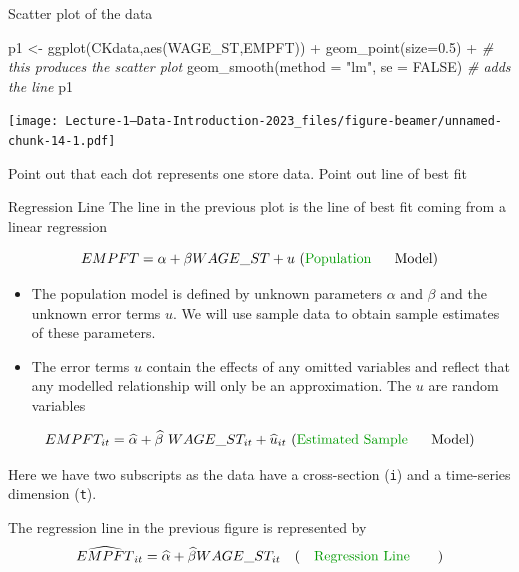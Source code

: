 \documentclass[
  ignorenonframetext,
]{beamer}
\newenvironment{Shaded}{\begin{snugshade}}{\end{snugshade}}
\newcommand{\AttributeTok}[1]{\textcolor[rgb]{0.77,0.63,0.00}{#1}}
\newcommand{\CommentTok}[1]{\textcolor[rgb]{0.56,0.35,0.01}{\textit{#1}}}
\newcommand{\ConstantTok}[1]{\textcolor[rgb]{0.00,0.00,0.00}{#1}}
\newcommand{\FloatTok}[1]{\textcolor[rgb]{0.00,0.00,0.81}{#1}}
\newcommand{\FunctionTok}[1]{\textcolor[rgb]{0.00,0.00,0.00}{#1}}
\newcommand{\NormalTok}[1]{#1}
\newcommand{\OtherTok}[1]{\textcolor[rgb]{0.56,0.35,0.01}{#1}}
\newcommand{\SpecialCharTok}[1]{\textcolor[rgb]{0.00,0.00,0.00}{#1}}
\newcommand{\StringTok}[1]{\textcolor[rgb]{0.31,0.60,0.02}{#1}}
\begin{document}
\begin{frame}[fragile]{Scatter plot of the data}
\protect\hypertarget{scatter-plot-of-the-data}{}
\begin{Shaded}
\begin{Highlighting}[]
\NormalTok{p1 }\OtherTok{\textless{}{-}} \FunctionTok{ggplot}\NormalTok{(CKdata,}\FunctionTok{aes}\NormalTok{(WAGE\_ST,EMPFT)) }\SpecialCharTok{+}
  \FunctionTok{geom\_point}\NormalTok{(}\AttributeTok{size=}\FloatTok{0.5}\NormalTok{) }\SpecialCharTok{+}    \CommentTok{\# this produces the scatter plot}
  \FunctionTok{geom\_smooth}\NormalTok{(}\AttributeTok{method =} \StringTok{"lm"}\NormalTok{, }\AttributeTok{se =} \ConstantTok{FALSE}\NormalTok{)  }\CommentTok{\# adds the line }
\NormalTok{p1}
\end{Highlighting}
\end{Shaded}

\texttt{[image: Lecture-1---Data-Introduction-2023\_files/figure-beamer/unnamed-chunk-14-1.pdf]}

\footnotesize

\textcolor{student}{Point out that each dot represents one store data. Point out line of best fit}
\normalsize
\end{frame}

\begin{frame}{Regression Line}
\protect\hypertarget{regression-line}{}
The line in the previous plot is the line of best fit coming from a
linear regression

\vskip -0.5cm

\[EMPFT = \alpha + \beta WAGE\_ST + u ~\text{(\textcolor{student}{Population}~~~~ Model)}\]
\vskip -0.2cm

\begin{itemize}
  \item The population model is defined by unknown parameters $\alpha$ and $\beta$ and the unknown error terms $u$. We will use sample data to obtain sample estimates of these parameters.
  \item The error terms $u$ contain the effects of any omitted variables and reflect that any modelled relationship will only be an approximation. The $u$ are \textcolor{student}{random variables}
\end{itemize}

\vskip -0.5cm

\[ EMPFT_{it} = \widehat{\alpha} + \widehat{\beta} ~ WAGE\_ST_{it} + \widehat{u}_{it} ~\text{(\textcolor{student}{Estimated Sample} ~~~~Model)}\]
\vskip -0.2cm

Here we have two subscripts as the data have a cross-section
(\texttt{\textcolor{student}{i}}) and a time-series dimension
(\texttt{\textcolor{student}{t}}).

The regression line in the previous figure is represented by
\vskip -0.5cm
\[ \widehat{EMPFT}_{it} = \widehat{\alpha} + \widehat{\beta} WAGE\_ST_{it} ~~~\text{(~~~\textcolor{student}{Regression Line}~~~~~~)}\]
\end{frame}
\end{document}
